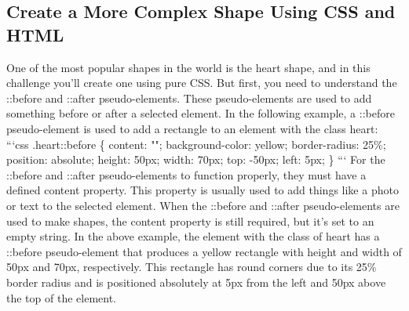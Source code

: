 \documentclass{article}%
\begin{document}
%
\subsection{Create a More Complex Shape Using CSS and HTML}%
\label{subsec:CreateaMoreComplexShapeUsingCSSandHTML}%
One of the most popular shapes in the world is the heart shape, and in this challenge you'll create one using pure CSS. But first, you need to understand the ::before and ::after pseudo{-}elements. These pseudo{-}elements are used to add something before or after a selected element. In the following example, a ::before pseudo{-}element is used to add a rectangle to an element with the class heart:\newline%
```css\newline%
.heart::before \{\newline%
  content: "";\newline%
  background{-}color: yellow;\newline%
  border{-}radius: 25\%;\newline%
  position: absolute;\newline%
  height: 50px;\newline%
  width: 70px;\newline%
  top: {-}50px;\newline%
  left: 5px;\newline%
\}\newline%
```\newline%
For the ::before and ::after pseudo{-}elements to function properly, they must have a defined content property. This property is usually used to add things like a photo or text to the selected element. When the ::before and ::after pseudo{-}elements are used to make shapes, the content property is still required, but it's set to an empty string.\newline%
In the above example, the element with the class of heart has a ::before pseudo{-}element that produces a yellow rectangle with height and width of 50px and 70px, respectively. This rectangle has round corners due to its 25\% border radius and is positioned absolutely at 5px from the left and 50px above the top of the element.\newline%

%
\end{document}
